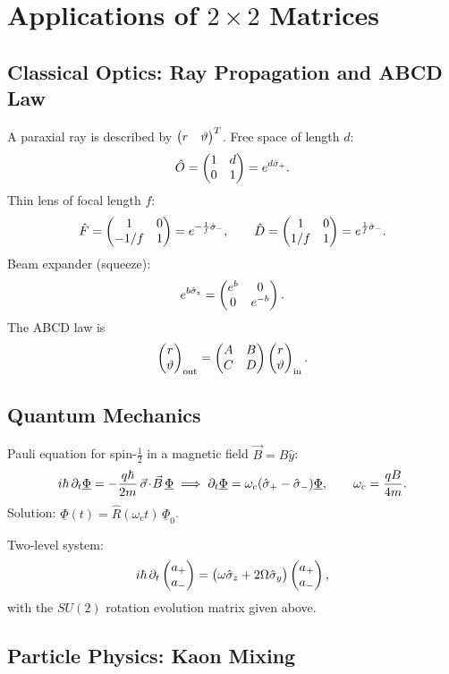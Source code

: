 \section{Applications of $2\times 2$ Matrices}
\label{sec:1.3}

\subsection{Classical Optics: Ray Propagation and ABCD Law}

A paraxial ray is described by $\begin{pmatrix}r & \vartheta\end{pmatrix}^{T}$.
Free space of length $d$:
\[
\hat{O} = \begin{pmatrix}1 & d \\ 0 & 1\end{pmatrix} = e^{d\hat{\sigma}_{+}}.
\]
Thin lens of focal length $f$:
\[
\hat{F} = \begin{pmatrix}1 & 0 \\ -1/f & 1\end{pmatrix} = e^{-\frac{1}{f}\hat{\sigma}_{-}},\qquad
\hat{D} = \begin{pmatrix}1 & 0 \\ 1/f & 1\end{pmatrix} = e^{\frac{1}{f}\hat{\sigma}_{-}}.
\]
Beam expander (squeeze):
\[
e^{b\hat{\sigma}_{z}} = \begin{pmatrix}e^{b} & 0 \\ 0 & e^{-b}\end{pmatrix}.
\]
The ABCD law is
\[
\begin{pmatrix}r \\ \vartheta\end{pmatrix}_{\mathrm{out}}
= \begin{pmatrix}A & B \\ C & D\end{pmatrix}
  \begin{pmatrix}r \\ \vartheta\end{pmatrix}_{\mathrm{in}}.
\]

\subsection{Quantum Mechanics}

Pauli equation for spin-$\tfrac{1}{2}$ in a magnetic field $\vec{B}=B\hat{y}$:
\[
i\hbar\,\partial_{t}\underline{\Phi}
= -\frac{q\hbar}{2m}\,\vec{\sigma}\!\cdot\!\vec{B}\,\underline{\Phi}
\;\Longrightarrow\;
\partial_{t}\underline{\Phi}
= \omega_{c}(\hat{\sigma}_{+}-\hat{\sigma}_{-})\underline{\Phi},\qquad
\omega_{c} = \frac{qB}{4m}.
\]
Solution: $\underline{\Phi}(t) = \hat{R}(\omega_{c}t)\,\underline{\Phi}_{0}$.

Two-level system:
\[
i\hbar\,\partial_{t}\begin{pmatrix}a_{+} \\ a_{-}\end{pmatrix}
= \bigl(\omega\hat{\sigma}_{z} + 2\Omega\hat{\sigma}_{y}\bigr)\begin{pmatrix}a_{+} \\ a_{-}\end{pmatrix},
\]
with the $SU(2)$ rotation evolution matrix given above.

\subsection{Particle Physics: Kaon Mixing}

